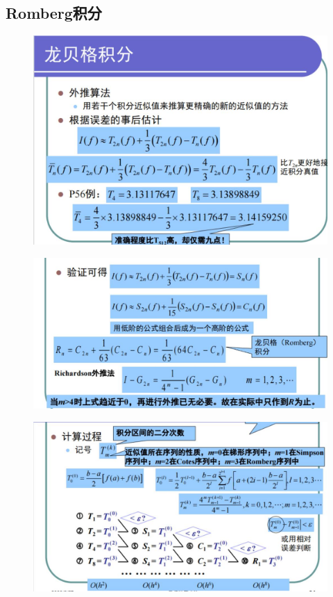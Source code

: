 \documentclass[a4paper,12pt]{ctexart}
\begin{document}
\subsection{Romberg积分}
\begin{figure}[H]
    \centering
    \includegraphics[width=14cm]{第五章作业/rb1.jpg}
\end{figure}
\begin{figure}[H]
    \centering
    \includegraphics[width=14cm]{第五章作业/rb2.jpg}
\end{figure}
\begin{figure}[H]
    \centering
    \includegraphics[width=14cm]{第五章作业/rb3.jpg}
\end{figure}
\end{document}
